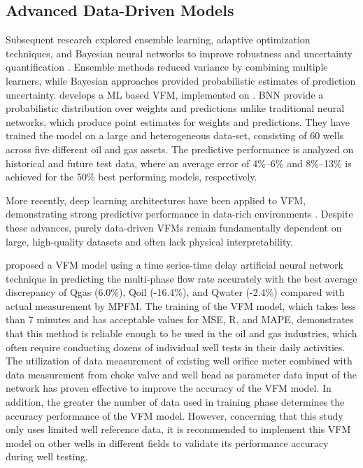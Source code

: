\documentclass[12pt,APA]{uomthesis}
\begin{document}
\subsection{Advanced Data-Driven Models}
Subsequent research explored ensemble learning, adaptive optimization techniques, and Bayesian neural networks to improve robustness and uncertainty quantification \citep{al2018virtual,grimstad2021bayesian}. Ensemble methods reduced variance by combining multiple learners, while Bayesian approaches provided probabilistic estimates of prediction uncertainty.
\citep{grimstad2021bayesian} develops a ML based VFM, implemented on . BNN provide a probabilistic distribution over weights and predictions unlike traditional neural networks, which produce point estimates for weights and predictions. They have trained the model on a large and heterogeneous data-set, consisting of 60 wells across five different oil and gas assets. The predictive performance is analyzed on historical and future test data, where an average error of 4\%–6\% and 8\%–13\% is achieved for the 50\% best performing models, respectively. 

More recently, deep learning architectures have been applied to VFM, demonstrating strong predictive performance in data-rich environments \citep{song2022intelligent,mercante2022virtual}. Despite these advances, purely data-driven VFMs remain fundamentally dependent on large, high-quality datasets and often lack physical interpretability.

\citep{muchsin2023virtual} proposed a VFM model using a time series-time delay artificial neural network technique in predicting the multi-phase flow rate accurately with the best average discrepancy of Qgas (6.0\%), Qoil (-16.4\%), and Qwater (-2.4\%) compared with actual measurement by MPFM. The training of the VFM model, which takes less than 7 minutes and has acceptable values for MSE, R, and MAPE, demonstrates that this method is reliable enough to be used in the oil and gas industries, which often require conducting dozens of individual well tests in their daily activities. The utilization of data measurement of existing well orifice meter combined with data measurement from choke valve and well head as parameter data input of the network has proven effective to improve the accuracy of the VFM model. In addition, the greater the number of data used in training phase determines the accuracy performance of the VFM model. However, concerning that this study only uses limited well reference data, it is recommended to implement this VFM model on other wells in different fields to validate its performance accuracy during well testing.
\end{document}
